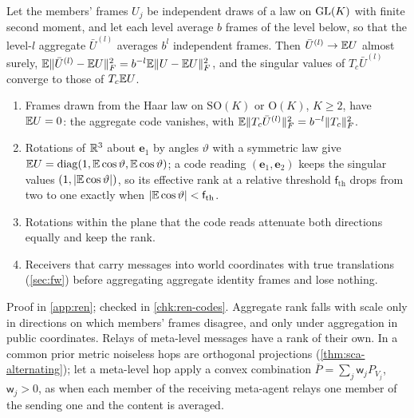\begin{proposition}\label{prop:ren-code-levels}
Let the members' frames $U_j$ be independent draws of a law on $\mathrm{GL}(K)$ with finite second moment, and let each level average $b$ frames of the level below, so that the level-$l$ aggregate $\bar U^{(l)}$ averages $b^l$ independent frames. Then $\bar U^{(l)}\to\mathbb{E} U$ almost surely, $\mathbb{E}\Vert\bar U^{(l)}-\mathbb{E} U\Vert_F^2=b^{-l}\mathbb{E}\Vert U-\mathbb{E} U\Vert_F^2$, and the singular values of $T_c\bar U^{(l)}$ converge to those of $T_c\mathbb{E} U$.
\begin{enumerate}
\item[(a)] Frames drawn from the Haar law on $\mathrm{SO}(K)$ or $\mathrm O(K)$, $K\ge2$, have $\mathbb{E} U=0$: the aggregate code vanishes, with $\mathbb{E}\Vert T_c\bar U^{(l)}\Vert_F^2=b^{-l}\Vert T_c\Vert_F^2$.
\item[(b)] Rotations of $\mathbb{R}^3$ about $\mathbf e_1$ by angles $\vartheta$ with a symmetric law give $\mathbb{E} U=\operatorname{diag}(1,\mathbb{E}\cos\vartheta,\mathbb{E}\cos\vartheta)$; a code reading $(\mathbf e_1,\mathbf e_2)$ keeps the singular values $(1,\lvert\mathbb{E}\cos\vartheta\rvert)$, so its effective rank at a relative threshold $\mathsf f_{\mathrm{th}}$ drops from two to one exactly when $\lvert\mathbb{E}\cos\vartheta\rvert<\mathsf f_{\mathrm{th}}$.
\item[(c)] Rotations within the plane that the code reads attenuate both directions equally and keep the rank.
\item[(d)] Receivers that carry messages into world coordinates with true translations (\cref{sec:fw}) before aggregating aggregate identity frames and lose nothing.
\end{enumerate}
\end{proposition}
Proof in \cref{app:ren}; checked in \cref{chk:ren-codes}. Aggregate rank falls with scale only in directions on which members' frames disagree, and only under aggregation in public coordinates. Relays of meta-level messages have a rank of their own. In a common prior metric noiseless hops are orthogonal projections (\cref{thm:sca-alternating}); let a meta-level hop apply a convex combination $\bar P=\sum_j\mathsf w_jP_{V_j}$, $\mathsf w_j>0$, as when each member of the receiving meta-agent relays one member of the sending one and the content is averaged.

